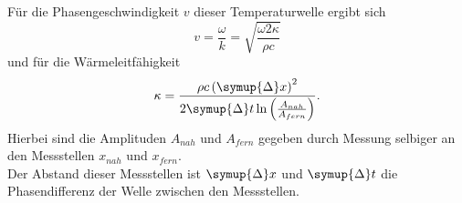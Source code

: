 Für die Phasengeschwindigkeit $v$ dieser Temperaturwelle ergibt sich
\begin{equation}
    v = \frac{\omega}{k} = \sqrt{\frac{\omega 2 \kappa}{\rho c}}
\end{equation}
und für die Wärmeleitfähigkeit
\begin{equation}
    \label{eqn:kappa}
    \kappa = \frac{\rho c \left(\symup{\Delta}x\right)^2}{2\symup{\Delta}t\ln\left(\frac{A_{nah}}{A_{fern}}\right)}.
\end{equation}
Hierbei sind die Amplituden $A_{nah}$ und $A_{fern}$ gegeben durch Messung selbiger an den Messstellen $x_{nah}$ und $x_{fern}$.\\
Der Abstand dieser Messstellen ist $\symup{\Delta}x$ und $\symup{\Delta}t$ die Phasendifferenz der Welle zwischen den Messstellen.
